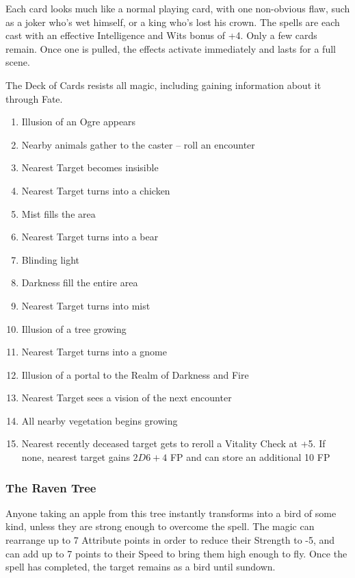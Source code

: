 Each card looks much like a normal playing card, with one non-obvious flaw, such as a joker who's wet himself, or a king who's lost his crown.  The spells are each cast with an effective Intelligence and Wits bonus of +4.  Only a few cards remain.  Once one is pulled, the effects activate immediately and lasts for a full scene.

The Deck of Cards resists all magic, including gaining information about it through Fate.

\begin{tcolorbox}
	\begin{enumerate}
		\item{Illusion of an Ogre appears}
		\item{Nearby animals gather to the caster -- roll an encounter}
		\item{Nearest Target becomes insisible}
		\item{Nearest Target turns into a chicken}
		\item{Mist fills the area}
		\item{Nearest Target turns into a bear}
		\item{Blinding light}
		\item{Darkness fill the entire area}
		\item{Nearest Target turns into mist}
		\item{Illusion of a tree growing}
		\item{Nearest Target turns into a gnome}
		\item{Illusion of a portal to the Realm of Darkness and Fire}
		\item{Nearest Target sees a vision of the next encounter}
		\item{All nearby vegetation begins growing}
		\item{Nearest recently deceased target gets to reroll a Vitality Check at +5.  If none, nearest target gains $2D6+4$ FP and can store an additional 10 FP}
	\end{enumerate}
\end{tcolorbox}

\subsubsection{The Raven Tree}
Anyone taking an apple from this tree instantly transforms into a bird of some kind, unless they are strong enough to overcome the spell.  The magic can rearrange up to 7 Attribute points in order to reduce their Strength to -5, and can add up to 7 points to their Speed to bring them high enough to fly.  Once the spell has completed, the target remains as a bird until sundown.


